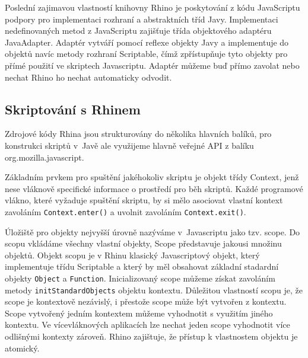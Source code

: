 Poslední zajimavou vlastností knihovny Rhino je poskytování z kódu JavaScriptu podpory pro implementaci rozhraní a abstraktních tříd Javy. Implementaci nedefinovaných metod z JavaScriptu zajišťuje třída objektového adaptéru JavaAdapter. Adaptér vytváří pomocí reflexe objekty Javy a implementuje do objektů navíc metody rozhraní Scriptable, čímž zpřístupňuje tyto objekty pro přímé použití ve skriptech Javascriptu. Adaptér můžeme buď přímo zavolat nebo nechat Rhino ho nechat automaticky odvodit. 


\subsection{Skriptování s Rhinem}
\label{Chapter.JavaScriptInJavaAnalysis.Rhino.ScriptingWithRhino}

Zdrojové kódy Rhina jsou strukturovány do několika hlavních balíků, pro konstrukci skriptů v~Javě ale využijeme hlavně veřejné API z balíku org.mozilla.javascript.

Základním prvkem pro spuštění jakéhokoliv skriptu je objekt třídy Context, jenž nese vláknově specifické informace o prostředí pro běh skriptů. Každé programové vlákno, které vyžaduje spuštění skriptu, by si mělo asociovat vlastní kontext zavoláním \texttt{Context.enter()} a uvolnit zavoláním \texttt{Context.exit()}. \cite{Bibliography.Rhino.ScopesAndContexts}

Úložiště pro objekty nejvyšší úrovně nazýváme v~Javascriptu jako tzv. scope. Do scopu vkládáme všechny vlastní objekty, Scope představuje jakousi množinu objektů. Objekt scopu je v Rhinu klasický Javascriptový objekt, který implementuje třídu Scriptable a který by měl obsahovat základní stadardní objekty \texttt{Object} a \texttt{Function}. Inicializovaný scope můžeme získat zavoláním metody \texttt{initStandardObjects} objektu kontextu. Důležitou vlastností scopu je, že scope je kontextově nezávislý, i přestože scope může být vytvořen z kontextu. Scope vytvořený jedním kontextem můžeme vyhodnotit s využitím jiného kontextu. Ve vícevláknových aplikacích lze nechat jeden scope vyhodnotit více odlišnými kontexty zároveň. Rhino zajištuje, že přístup k vlastnostem objektu je atomický. \cite{Bibliography.Rhino.ScopesAndContexts}

